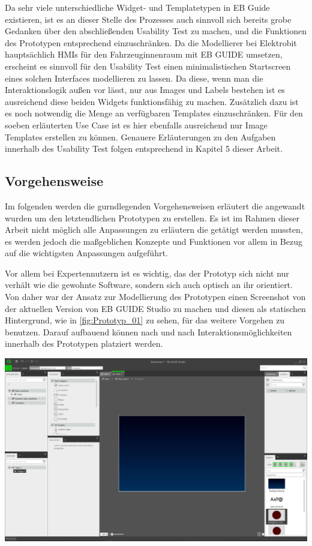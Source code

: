 Da sehr viele unterschiedliche Widget- und Templatetypen in EB Guide existieren, ist es an dieser Stelle des Prozesses auch sinnvoll sich bereits grobe Gedanken über den abschließenden Usability Test zu machen, und die Funktionen des Prototypen entsprechend einzuschränken.
Da die Modellierer bei Elektrobit hauptsächlich HMIs für den Fahrzeuginnenraum mit EB GUIDE umsetzen, erscheint es sinnvoll für den Usability Test einen minimalistischen Startscreen eines solchen Interfaces modellieren zu lassen.
Da diese, wenn man die Interaktionslogik außen vor lässt, nur aus Images und Labels bestehen ist es ausreichend diese beiden Widgets funktionsfähig zu machen.
Zusätzlich dazu ist es noch notwendig die Menge an verfügbaren Templates einzuschränken.
Für den soeben erläuterten Use Case ist es hier ebenfalls ausreichend nur Image Templates erstellen zu können.
Genauere Erläuterungen zu den Aufgaben innerhalb des Usability Test folgen entsprechend in Kapitel 5 dieser Arbeit.


\subsection{Vorgehensweise}
Im folgenden werden die gurndlegenden Vorgehensweisen erläutert die angewandt wurden um den letztendlichen Prototypen zu erstellen.
Es ist im Rahmen dieser Arbeit nicht möglich alle Anpassungen zu erläutern die getätigt werden mussten, es werden jedoch die maßgeblichen Konzepte und Funktionen vor allem in Bezug auf die wichtigsten Anpassungen aufgeführt.

Vor allem bei Expertennutzern ist es wichtig, das der Prototyp sich nicht nur verhält wie die  gewohnte Software, sondern sich auch optisch an ihr orientiert.
Von daher war der Ansatz zur Modellierung des Prototypen einen Screenshot von der aktuellen Version von EB GUIDE Studio zu machen und diesen als statischen Hintergrund, wie in \cref{fig:Prototyp_01} zu sehen, für das weitere Vorgehen zu benutzen.
Darauf aufbauend können nach und nach Interaktionsmöglichkeiten innerhalb des Prototypen platziert werden.

\begin{center}
  \includegraphics[scale=0.4]{figures/Prototyp_01.PNG}
  \label{fig:Prototyp_01}
\end{center}

